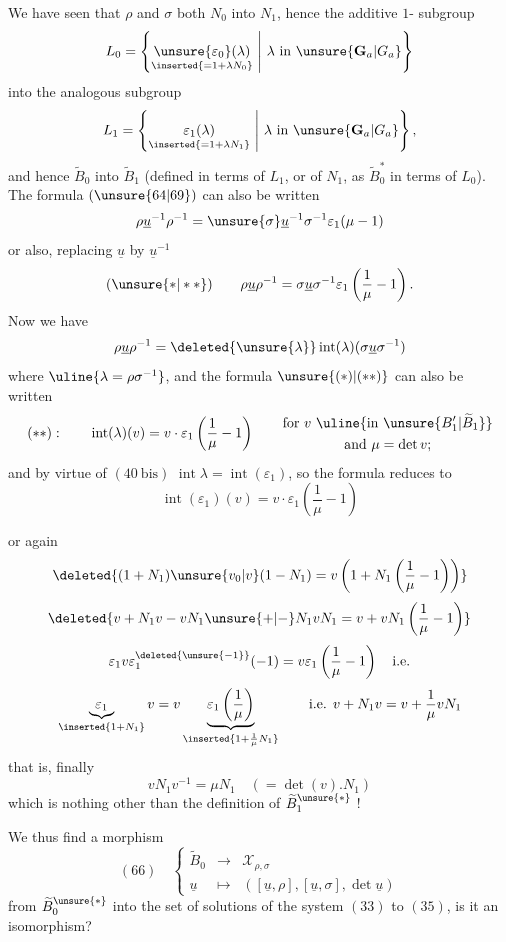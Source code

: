 We have seen that $\rho$ and $\sigma$ both  $N_0$ into $N_1$, hence the additive $1$- subgroup
\[
L_0=\left\{\underset{\inserted{=1+\lambda N_0}}{\unsure{\varepsilon_0}(\lambda)}\ \middle|\ \lambda\text{ in }\unsure{\mathbf G_a|G_a}\right\}
\]
into the analogous subgroup
\[
L_1=\left\{\underset{\inserted{=1+\lambda N_1}}{\varepsilon_1(\lambda)}\ \middle|\ \lambda\text{ in }\unsure{\mathbf G_a|G_a}\right\},
\]
and hence $\widetilde B_0$ into $\widetilde B_1$ (defined in terms of $L_1$, or of $N_1$, as $\widetilde B_0^*$ in terms of $L_0$).  The formula $(\unsure{64|69})$ can also be written
\[
\rho\underline u^{-1}\rho^{-1}=\unsure{\sigma}\underline u^{-1}\sigma^{-1}\varepsilon_1(\mu-1)
\]
or also, replacing $\underline u$ by $\underline u^{-1}$
\[
(\unsure{*|**})\qquad
\rho\underline u\rho^{-1}=\sigma\underline u\sigma^{-1}\varepsilon_1\left(\frac1\mu-1\right).
\]
Now we  have
\[
\rho\underline u\rho^{-1}=\deleted{\unsure{\lambda}}\operatorname{int}(\lambda)(\sigma\underline u\sigma^{-1})
\]
where $\uline{\lambda=\rho\sigma^{-1}}$, and the formula $\unsure{(*)|(**)}$ can also be written
\[
(**):\qquad
\operatorname{int}(\lambda)(v)=v\cdot\varepsilon_1\left(\frac1\mu-1\right)
\qquad\begin{gathered}
\text{for }v\ \uline{\text{in }\unsure{B'_1|\widetilde B_1}}\\
\text{and }\mu=\det v;
\end{gathered}
\]
and by virtue of $(40\ \mathrm{bis})$ $\operatorname{int}\lambda=\operatorname{int}(\varepsilon_1)$, so the formula reduces to
\[
\operatorname{int}(\varepsilon_1)(v)=v\cdot\varepsilon_1\left(\frac1\mu-1\right)
\]



or again
\[
\deleted{(1+N_1)\unsure{v_0|v}(1-N_1)=v\left(1+N_1\left(\frac1\mu-1\right)\right)}
\]
\[
\deleted{v+N_1v-vN_1\unsure{+|-}N_1vN_1=v+vN_1\left(\frac1\mu-1\right)}
\]
\[
\varepsilon_1v\varepsilon_1^{\deleted{\unsure{-1}}}(-1)=v\varepsilon_1\left(\frac1\mu-1\right)\quad\text{i.e.}
\]
\[
\underbrace{\varepsilon_1}_{\inserted{1+N_1}}v
=v\underbrace{\varepsilon_1\left(\frac1\mu\right)}_{\inserted{1+\frac1\mu N_1}}
\qquad\text{i.e. }v+N_1v=v+\frac1\mu vN_1
\]
that is, finally
\[
vN_1v^{-1}=\mu N_1\quad(=\det(v).N_1)
\]
which is nothing other than the definition of $\widetilde B_1^{\unsure{*}}$ !

We thus find a morphism
\[
(66)\quad\left\{\begin{array}{rcl}
\widetilde B_0&\longrightarrow&\mathcal X_{\rho,\sigma}\\
\underline u&\longmapsto&([\underline u,\rho],[\underline u,\sigma],\det\underline u)
\end{array}\right.
\]
from $\widetilde B_0^{\unsure{*}}$ into the set of solutions of the system $(33)$ to $(35)$, is it an isomorphism?

